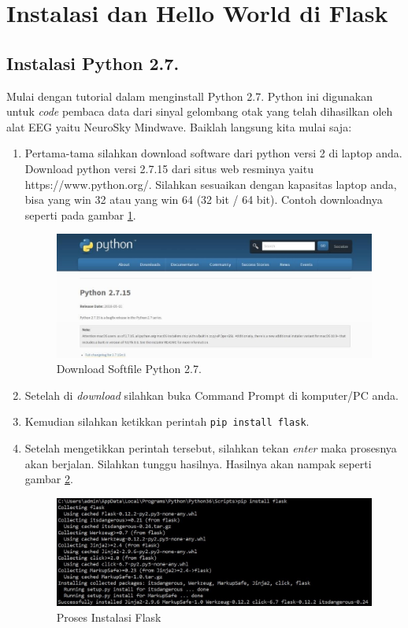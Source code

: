 \section{Instalasi dan Hello World di Flask}

\subsection{Instalasi Python 2.7.}

Mulai dengan tutorial dalam menginstall Python 2.7. Python ini digunakan untuk \textit{code} pembaca data dari sinyal gelombang otak yang telah dihasilkan oleh alat EEG yaitu NeuroSky Mindwave. Baiklah langsung kita mulai saja:
\begin{enumerate}
\item Pertama-tama silahkan download software dari python versi 2 di laptop anda. Download python versi 2.7.15 dari situs web resminya yaitu https://www.python.org/. Silahkan sesuaikan dengan kapasitas laptop anda, bisa yang win 32 atau yang win 64 (32 bit / 64 bit). Contoh downloadnya seperti pada gambar \ref{fig:python}.
\begin{figure}[!htbp]
	\centerline{\includegraphics[width=1\textwidth]{figures/8/python.jpg}}
	\caption{Download Softfile Python 2.7.}
	\label{fig:python}
\end{figure}

\item Setelah di \textit{download}  silahkan  buka  Command  Prompt  di komputer/PC anda.
\item Kemudian silahkan ketikkan perintah \verb|pip install flask|.
\item Setelah mengetikkan perintah tersebut, silahkan tekan \textit{enter} maka prosesnya akan berjalan. Silahkan tunggu hasilnya. Hasilnya akan nampak seperti gambar \ref{fig:cek_python}.
\begin{figure}[!htbp]
	\centerline{\includegraphics[width=1\textwidth]{figures/8/cek_python.jpg}}
	\caption{Proses Instalasi Flask}
	\label{fig:cek_python}
\end{figure}

\end{enumerate}

